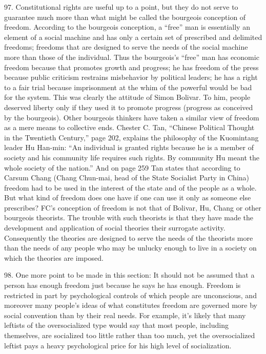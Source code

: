 \documentclass{article}
\begin{document}
97. Constitutional rights are useful up to a point, but they do not serve to guarantee much more 
than what might be called the bourgeois conception of freedom. According to the bourgeois 
conception, a “free” man is essentially an element of a social machine and has only a certain set 
of prescribed and delimited freedoms; freedoms that are designed to serve the needs of the social 
machine more than those of the individual. Thus the bourgeois’s “free” man has economic 
freedom because that promotes growth and progress; he has freedom of the press because public 
criticism restrains misbehavior by political leaders; he has a right to a fair trial because 
imprisonment at the whim of the powerful would be bad for the system. This was clearly the 
attitude of Simon Bolivar. To him, people deserved liberty only if they used it to promote progress 
(progress as conceived by the bourgeois). Other bourgeois thinkers have taken a similar view of 
freedom as a mere means to collective ends. Chester C. Tan, “Chinese Political Thought in the 
Twentieth Century,” page 202, explains the philosophy of the Kuomintang leader Hu Han-min: 
“An individual is granted rights because he is a member of society and his community life requires 
such rights. By community Hu meant the whole society of the nation.” And on page 259 Tan 
states that according to Carsum Chang (Chang Chun-mai, head of the State Socialist Party in 
China) freedom had to be used in the interest of the state and of the people as a whole. But what 
kind of freedom does one have if one can use it only as someone else prescribes? FC’s conception 
of freedom is not that of Bolivar, Hu, Chang or other bourgeois theorists. The trouble with such 
theorists is that they have made the development and application of social theories their surrogate 
activity. Consequently the theories are designed to serve the needs of the theorists more than the 
needs of any people who may be unlucky enough to live in a society on which the theories are 
imposed. \vspace{\baselineskip}
 
98. One more point to be made in this section: It should not be assumed that a person has enough 
freedom just because he says he has enough. Freedom is restricted in part by psychological 
controls of which people are unconscious, and moreover many people’s ideas of what constitutes 
freedom are governed more by social convention than by their real needs. For example, it’s likely 
that many leftists of the oversocialized type would say that most people, including themselves, are 
socialized too little rather than too much, yet the oversocialized leftist pays a heavy psychological 
price for his high level of socialization. 
\end{document}
